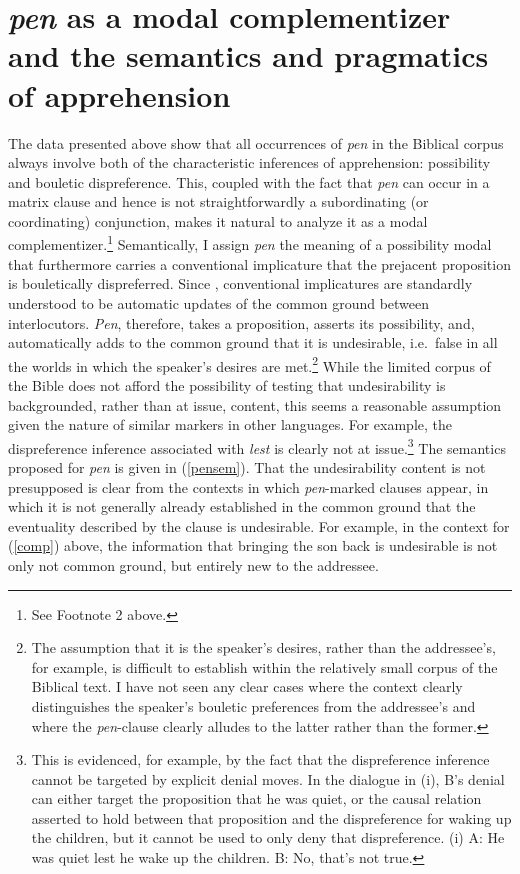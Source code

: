 \documentclass[output=paper,colorlinks,citecolor=brown]{langscibook}
\begin{document}
\section{\textit{pen} as a modal complementizer and the semantics and pragmatics of apprehension}
\label{sec:analysis}
The data presented above show that all occurrences of \textit{pen} in the Biblical corpus always involve both of the characteristic inferences of apprehension: possibility and bouletic dispreference. This, coupled with the fact that \textit{pen} can occur in a matrix clause and hence is not straightforwardly a subordinating (or coordinating) conjunction, makes it natural to analyze it as a modal complementizer.\footnote{See Footnote 2 above.} Semantically, I assign \textit{pen} the meaning of a possibility modal that furthermore carries a conventional implicature that the prejacent proposition is bouletically dispreferred. Since \citet{karttunen-peters}, conventional implicatures are  standardly understood to be automatic updates of the common ground between interlocutors. \textit{Pen}, therefore, takes a proposition, asserts its possibility, and, automatically adds to the common ground that it is  undesirable, i.e.\ false in all the worlds in which the speaker's desires are met.\footnote{The assumption that it is the speaker's desires, rather than the addressee's, for example, is difficult to establish within the relatively small corpus of the Biblical text. I have not seen any clear cases where the context clearly distinguishes the speaker's bouletic preferences from the addressee's and where the \textit{pen}-clause clearly alludes to the latter rather than the former.} While the limited corpus of the  Bible does not afford the possibility of testing that undesirability is backgrounded, rather than at issue, content, this seems a reasonable assumption given the nature of similar markers in other languages. For example, the dispreference inference associated with  \textit{lest} is clearly not at issue.\footnote{This is evidenced, for example, by the fact that the dispreference inference cannot be targeted by explicit denial moves. In the dialogue in (i), B's denial can either target the proposition that he was quiet, or the causal relation asserted to hold between that proposition and the dispreference for waking up the children, but it cannot be used to only deny that dispreference. (i) A: He was quiet lest he wake up the children. B: No, that's not true.} The semantics proposed for \textit{pen} is given in (\ref{pensem}). That the  undesirability content is not presupposed is clear from the contexts in which \textit{pen}-marked clauses appear, in which it is not generally already established in the common ground that the eventuality described by the clause is undesirable. For example, in the context for (\ref{comp}) above, the information that bringing the son back is undesirable is not only not common ground, but entirely new to the addressee. 
\end{document}
